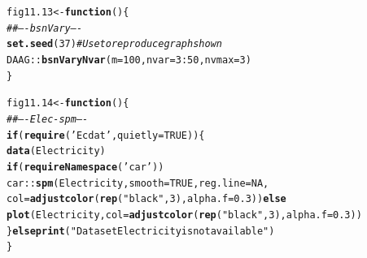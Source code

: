 \documentclass[12pt, a4paper,  BCOR=8.25mm, DIV=15]{scrartcl}\usepackage[]{graphicx}\usepackage[]{color}
\makeatletter
\newcommand{\hlnum}[1]{\textcolor[rgb]{0.686,0.059,0.569}{#1}}%
\newcommand{\hlstr}[1]{\textcolor[rgb]{0.192,0.494,0.8}{#1}}%
\newcommand{\hlcom}[1]{\textcolor[rgb]{0.678,0.584,0.686}{\textit{#1}}}%
\newcommand{\hlopt}[1]{\textcolor[rgb]{0,0,0}{#1}}%
\newcommand{\hlstd}[1]{\textcolor[rgb]{0.345,0.345,0.345}{#1}}%
\newcommand{\hlkwa}[1]{\textcolor[rgb]{0.161,0.373,0.58}{\textbf{#1}}}%
\newcommand{\hlkwb}[1]{\textcolor[rgb]{0.69,0.353,0.396}{#1}}%
\newcommand{\hlkwc}[1]{\textcolor[rgb]{0.333,0.667,0.333}{#1}}%
\newcommand{\hlkwd}[1]{\textcolor[rgb]{0.737,0.353,0.396}{\textbf{#1}}}%
\newenvironment{kframe}{%
 \def\at@end@of@kframe{}%
 \ifinner\ifhmode%
  \def\at@end@of@kframe{\end{minipage}}%
  \begin{minipage}{\columnwidth}%
 \fi\fi%
 \def\FrameCommand##1{\hskip\@totalleftmargin \hskip-\fboxsep
 \colorbox{shadecolor}{##1}\hskip-\fboxsep
     \hskip-\linewidth \hskip-\@totalleftmargin \hskip\columnwidth}%
 \MakeFramed {\advance\hsize-\width
   \@totalleftmargin\z@ \linewidth\hsize
   \@setminipage}}%
 {\par\unskip\endMakeFramed%
 \at@end@of@kframe}
\newenvironment{knitrout}{}{} %
\makeatother
\begin{document}
\begin{knitrout}
\color{fgcolor}\begin{kframe}
\begin{alltt}
\hlstd{fig11.13} \hlkwb{<-} \hlkwa{function}\hlstd{()\{}
\hlcom{## ---- bsnVary ----}
\hlkwd{set.seed}\hlstd{(}\hlnum{37}\hlstd{)}   \hlcom{# Use to reproduce graph shown}
\hlstd{DAAG}\hlopt{::}\hlkwd{bsnVaryNvar}\hlstd{(}\hlkwc{m}\hlstd{=}\hlnum{100}\hlstd{,} \hlkwc{nvar}\hlstd{=}\hlnum{3}\hlopt{:}\hlnum{50}\hlstd{,} \hlkwc{nvmax}\hlstd{=}\hlnum{3}\hlstd{)}
\hlstd{\}}
\end{alltt}
\end{kframe}
\end{knitrout}

\begin{knitrout}
\color{fgcolor}\begin{kframe}
\begin{alltt}
\hlstd{fig11.14} \hlkwb{<-} \hlkwa{function}\hlstd{()\{}
\hlcom{## ---- Elec-spm ----}
\hlkwa{if}\hlstd{(}\hlkwd{require}\hlstd{(}\hlstr{'Ecdat'}\hlstd{,} \hlkwc{quietly}\hlstd{=}\hlnum{TRUE}\hlstd{))\{}
  \hlkwd{data}\hlstd{(Electricity)}
  \hlkwa{if}\hlstd{(}\hlkwd{requireNamespace}\hlstd{(}\hlstr{'car'}\hlstd{))}
  \hlstd{car}\hlopt{::}\hlkwd{spm}\hlstd{(Electricity,} \hlkwc{smooth}\hlstd{=}\hlnum{TRUE}\hlstd{,} \hlkwc{reg.line}\hlstd{=}\hlnum{NA}\hlstd{,}
           \hlkwc{col}\hlstd{=}\hlkwd{adjustcolor}\hlstd{(}\hlkwd{rep}\hlstd{(}\hlstr{"black"}\hlstd{,}\hlnum{3}\hlstd{),} \hlkwc{alpha.f}\hlstd{=}\hlnum{0.3}\hlstd{))} \hlkwa{else}
      \hlkwd{plot}\hlstd{(Electricity,} \hlkwc{col}\hlstd{=}\hlkwd{adjustcolor}\hlstd{(}\hlkwd{rep}\hlstd{(}\hlstr{"black"}\hlstd{,}\hlnum{3}\hlstd{),} \hlkwc{alpha.f}\hlstd{=}\hlnum{0.3}\hlstd{))}
\hlstd{\}} \hlkwa{else} \hlkwd{print}\hlstd{(}\hlstr{"Dataset Electricity is not available"}\hlstd{)}
\hlstd{\}}
\end{alltt}
\end{kframe}
\end{knitrout}
\end{document}
